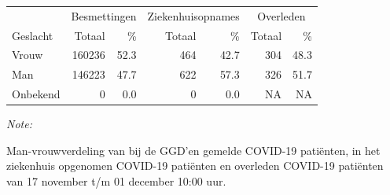 \documentclass[
  english,
  man,floatsintext]{apa6}
\begin{document}
\newpage

\begin{table}
\centering\begingroup\fontsize{11}{13}\selectfont

\begin{threeparttable}
\begin{tabular}{lrrrrrr}
\toprule
\multicolumn{1}{c}{ } & \multicolumn{2}{c}{Besmettingen} & \multicolumn{2}{c}{Ziekenhuisopnames} & \multicolumn{2}{c}{Overleden} \\
\cmidrule(l{3pt}r{3pt}){2-3} \cmidrule(l{3pt}r{3pt}){4-5} \cmidrule(l{3pt}r{3pt}){6-7}
Geslacht & Totaal & \% & Totaal & \% & Totaal & \%\\
\midrule
Vrouw & 160236 & 52.3 & 464 & 42.7 & 304 & 48.3\\
Man & 146223 & 47.7 & 622 & 57.3 & 326 & 51.7\\
Onbekend & 0 & 0.0 & 0 & 0.0 & NA & NA\\
\bottomrule
\end{tabular}
\begin{tablenotes}
\item \textit{Note: } 
\item Man-vrouwverdeling van bij de GGD’en gemelde COVID-19 patiënten, in het ziekenhuis opgenomen COVID-19 patiënten en overleden COVID-19 patiënten van 17 november t/m 01 december 10:00 uur.
\end{tablenotes}
\end{threeparttable}
\endgroup{}
\end{table}
\newpage
\end{document}
